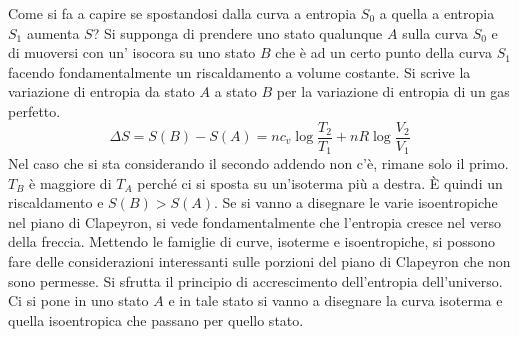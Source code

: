\documentclass[10pt,a4paper]{book}
\begin{document}
Come si fa a capire se spostandosi dalla curva a entropia $S_0$ a quella a entropia $S_1$ aumenta $S$?
Si supponga di prendere uno stato qualunque $A$ sulla curva $S_0$ e di muoversi con un' isocora su uno stato $B$ che è ad un certo punto della curva $S_1$ facendo fondamentalmente un riscaldamento a volume costante. Si scrive la variazione di entropia da stato $A$ a stato $B$ per la variazione di entropia di un gas perfetto.
\[
	\Delta S = S(B)-S(A) = nc_v\log \frac{T_2 }{T_1 } + nR \log \frac{V_2 }{V_1 }
\]
Nel caso che si sta considerando il secondo addendo non c'è, rimane solo il primo. $T_B$ è maggiore di $T_A$ perché ci si sposta su un'isoterma più a destra. È quindi un riscaldamento e $S(B)>S(A)$. Se si vanno a disegnare le varie isoentropiche nel piano di Clapeyron, si vede fondamentalmente che l'entropia cresce nel verso della freccia.
Mettendo le famiglie di curve, isoterme e isoentropiche, si possono fare delle considerazioni interessanti sulle porzioni del piano di Clapeyron che non sono permesse. Si sfrutta il principio di accrescimento dell'entropia dell'universo. Ci si pone in uno stato $A$ e in tale stato si vanno a disegnare la curva isoterma e quella isoentropica che passano per quello stato.
\end{document}
